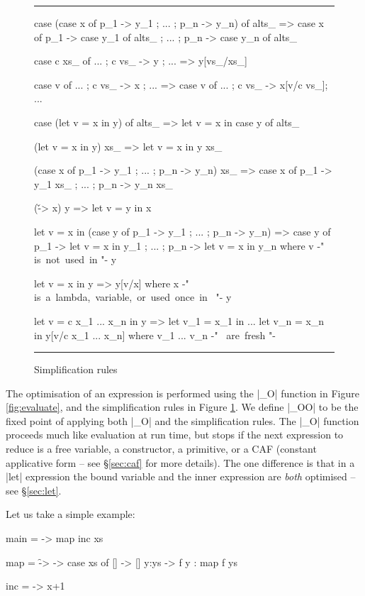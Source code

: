 \documentclass{llncs}
\newenvironment{fig}
    {\begin{figure}[tbp]\hrule}
    {\end{figure}}
\newcommand{\figend}{\hrule}
\begin{document}
\begin{fig}
\begin{code}
case (case x of {p_1 -> y_1 ; ... ; p_n -> y_n}) of alts_
    => case x of  {  p_1  -> case y_1 of alts_
                  ;  ...
                  ;  p_n  -> case y_n of alts_ }

case c xs_ of {... ; c vs_ -> y ; ...}
    => y[vs_/xs_]

case v of {... ; c vs_ -> x ; ...}
    => case v of {... ; c vs_ -> x[v/c vs_]; ...}

case (let v = x in y) of alts_
    => let v = x in case y of alts_

(let v = x in y) xs_
    => let v = x in y xs_

(case x of {p_1 -> y_1 ; ... ; p_n -> y_n}) xs_
    => case x of {p_1 -> y_1 xs_ ; ... ; p_n -> y_n xs_}

(\v -> x) y
    => let v = y in x

let v = x in (case y of {p_1 -> y_1 ; ... ; p_n -> y_n})
    => case y of  {  p_1  -> let v = x in y_1
                  ;  ...
                  ;  p_n  -> let v = x in y_n}
    where v {-" \hbox{is not used in} "-} y

let v = x in y
    => y[v/x]
    where x {-" \hbox{is a lambda, variable, or used once in } "-} y

let v = c x_1 ... x_n in y
    =>  let v_1 = x_1 in
        ...
        let v_n = x_n in
        y[v/c x_1 ... x_n]
    where v_1 ... v_n {-" \hbox{ are fresh} "-}
\end{code}
\figend
\caption{Simplification rules}
\label{fig:simplify}
\end{fig}

The optimisation of an expression is performed using the |_O| function in Figure \ref{fig:evaluate}, and the simplification rules in Figure \ref{fig:simplify}. We define |_OO| to be the fixed point of applying both |_O| and the simplification rules. The |_O| function proceeds much like evaluation at run time, but stops if the next expression to reduce is a free variable, a constructor, a primitive, or a CAF (constant applicative form -- see \S\ref{sec:caf} for more details). The one difference is that in a |let| expression the bound variable and the inner expression are \textit{both} optimised -- see \S\ref{sec:let}.

Let us take a simple example:

\begin{code}
main = \xs -> map inc xs

map = \f -> \xs -> case  xs of
                         []    -> []
                         y:ys  -> f y : map f ys

inc = \x -> x+1
\end{code}
\end{document}
